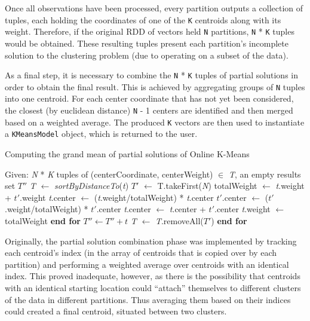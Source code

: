 \documentclass{l4proj}
\begin{document}
Once all observations have been processed, every partition outputs a collection of tuples, each holding the coordinates of one of the \texttt{K} centroids along with its weight. Therefore, if the original RDD of vectors held \texttt{N} partitions, \texttt{N} * \texttt{K} tuples would be obtained. These resulting tuples present each partition's incomplete solution to the clustering problem (due to operating on a subset of the data).

As a final step, it is necessary to combine the \texttt{N} * \texttt{K} tuples of partial solutions in order to obtain the final result. This is achieved by aggregating groups of \texttt{N} tuples into one centroid. For each center coordinate that has not yet been considered, the closest (by euclidean distance) \texttt{N} - 1 centers are identified and then merged based on a weighted average. The produced \texttt{K} vectors are then used to instantiate a \texttt{KMeansModel} object, which is returned to the user.

\begin{algorithm}[H]
\caption{Computing the grand mean of partial solutions of Online K-Means}\label{online-merge}
\begin{algorithmic}[1]
\State Given: \textit{N} * \textit{K} tuples of (centerCoordinate, centerWeight) $\in$ \textit{T}, an empty results set $T''$ 
    \State \textit{T}  $\gets$ \textit{sortByDistanceTo}(\textit{t})
    \State $T'$ $\gets$ T.takeFirst(\textit{N})
    	\State totalWeight $\gets$ \textit{t}.weight + $t'$.weight
        \State \textit{t}.center $\gets$ (\textit{t}.weight/totalWeight) * \textit{t}.center
        \State $t'$.center $\gets$ ($t'$.weight/totalWeight) * $t'$.center
        \State \textit{t}.center $\gets$ \textit{t}.center + $t'$.center
        \State \textit{t}.weight $\gets$ totalWeight
    \EndFor
    \State \textbf{end for}
    \State $T'' \gets T'' + t$
    \State \textit{T} $\gets$ \textit{T}.removeAll($T'$)
\EndFor
\State \textbf{end for}
\end{algorithmic}
\end{algorithm}

Originally, the partial solution combination phase was implemented by tracking each centroid's index (in the array of centroids that is copied over by each partition) and performing a weighted average over centroids with an identical index. This proved inadequate, however, as there is the possibility that centroids with an identical starting location could ``attach'' themselves to different clusters of the data in different partitions. Thus averaging them based on their indices could created a final centroid, situated between two clusters.
\end{document}
